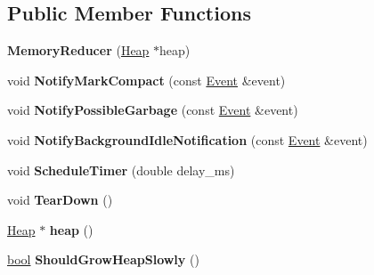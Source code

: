 \subsection*{Public Member Functions}
\begin{DoxyCompactItemize}
\item 
\mbox{\label{classv8_1_1internal_1_1MemoryReducer_ac96b54dd8d2483419d8798146dc6e332}} 
{\bfseries Memory\+Reducer} (\mbox{\hyperlink{classv8_1_1internal_1_1Heap}{Heap}} $\ast$heap)
\item 
\mbox{\label{classv8_1_1internal_1_1MemoryReducer_a1a5730063f4fecc950e8f86529e298d8}} 
void {\bfseries Notify\+Mark\+Compact} (const \mbox{\hyperlink{structv8_1_1internal_1_1MemoryReducer_1_1Event}{Event}} \&event)
\item 
\mbox{\label{classv8_1_1internal_1_1MemoryReducer_a3c5d18afac0c49c61ef034a72d7efca5}} 
void {\bfseries Notify\+Possible\+Garbage} (const \mbox{\hyperlink{structv8_1_1internal_1_1MemoryReducer_1_1Event}{Event}} \&event)
\item 
\mbox{\label{classv8_1_1internal_1_1MemoryReducer_a6e32ad630b941e4dc5e11e46ed987180}} 
void {\bfseries Notify\+Background\+Idle\+Notification} (const \mbox{\hyperlink{structv8_1_1internal_1_1MemoryReducer_1_1Event}{Event}} \&event)
\item 
\mbox{\label{classv8_1_1internal_1_1MemoryReducer_a92bb3db5e54080dd68d5988d1a6b6f22}} 
void {\bfseries Schedule\+Timer} (double delay\+\_\+ms)
\item 
\mbox{\label{classv8_1_1internal_1_1MemoryReducer_a3010ec7bd3d474cac493524bcec6b19b}} 
void {\bfseries Tear\+Down} ()
\item 
\mbox{\label{classv8_1_1internal_1_1MemoryReducer_a6d461b494e05eb173fab49be31f4f485}} 
\mbox{\hyperlink{classv8_1_1internal_1_1Heap}{Heap}} $\ast$ {\bfseries heap} ()
\item 
\mbox{\label{classv8_1_1internal_1_1MemoryReducer_a892aacadda91617fc2d8420102258380}} 
\mbox{\hyperlink{classbool}{bool}} {\bfseries Should\+Grow\+Heap\+Slowly} ()
\end{DoxyCompactItemize}
